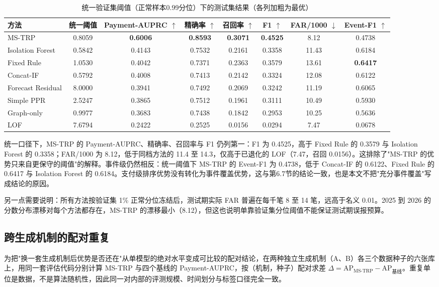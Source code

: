 \documentclass[a4paper,fleqn]{cas-dc}
\begin{document}
\begin{table}[pos=tbp]
\small
\caption{统一验证集阈值（正常样本0.99分位）下的测试集结果（各列加粗为最优）}
\begin{tabular*}{\tblwidth}{@{\extracolsep{\fill}}lccccccc@{}}
\toprule
方法 & 统一阈值 & Payment-AUPRC $\uparrow$ & 精确率 $\uparrow$ & 召回率 $\uparrow$ & F1 $\uparrow$ & FAR/1000 $\downarrow$ & Event-F1 $\uparrow$ \\
\midrule
MS-TRP & 0.8059 & \textbf{0.6006} & \textbf{0.8593} & \textbf{0.3071} & \textbf{0.4525} & 8.12 & 0.4738 \\
Isolation Forest & 0.5842 & 0.4143 & 0.7532 & 0.2161 & 0.3358 & 11.43 & 0.6184 \\
Fixed Rule & 1.0530 & 0.4042 & 0.7371 & 0.2363 & 0.3579 & 13.61 & \textbf{0.6417} \\
Concat-IF & 0.5792 & 0.4008 & 0.7413 & 0.2142 & 0.3324 & 12.08 & 0.6122 \\
Forecast Residual & 8.0000 & 0.3941 & 0.7492 & 0.2069 & 0.3242 & 11.19 & 0.6065 \\
Simple PPR & 2.5247 & 0.3865 & 0.7512 & 0.1961 & 0.3111 & 10.49 & 0.5930 \\
Graph-only & 0.9977 & 0.3683 & 0.7438 & 0.1842 & 0.2953 & 10.25 & 0.5636 \\
LOF & 7.6794 & 0.2422 & 0.2525 & 0.0156 & 0.0294 & 7.47 & 0.0678 \\
\bottomrule
\end{tabular*}
\end{table}

统一口径下，MS-TRP 的 Payment-AUPRC、精确率、召回率与 F1 仍列第一：F1 为 0.4525，高于 Fixed Rule 的 0.3579 与 Isolation Forest 的 0.3358；FAR/1000 为 8.12，低于同档方法的 11.4 至 14.3，仅高于已退化的 LOF（7.47，召回 0.0156）。这排除了"MS-TRP 的优势只来自更保守的阈值"的解释。事件级仍然相反：统一阈值下 MS-TRP 的 Event-F1 为 0.4738，低于 Concat-IF 的 0.6122、Fixed Rule 的 0.6417 与 Isolation Forest 的 0.6184。支付级排序优势没有转化为事件覆盖优势，这与第6.7节的结论一致，也是本文不把"充分事件覆盖"写成结论的原因。

另一点需要说明：所有方法按验证集 1\% 正常分位冻结后，测试期实际 FAR 普遍在每千笔 8 至 14 笔，远高于名义 0.01。2025 到 2026 的分数分布漂移对每个方法都存在，MS-TRP 的漂移最小（8.12），但这也说明单靠验证集分位阈值不能保证测试期误报预算。

\subsection{跨生成机制的配对重复}
为把"换一套生成机制后优势是否还在"从单模型的绝对水平变成可比较的配对结论，在两种独立生成机制（A、B）各三个数据种子的六张库上，用同一套评估代码分别计算 MS-TRP 与四个基线的 Payment-AUPRC，按（机制，种子）配对求差 $\Delta = \mathrm{AP}_{\text{MS-TRP}} - \mathrm{AP}_{\text{基线}}$。重复单位是数据，不是算法随机性，因此同一对内部的评测规模、时间划分与标签口径完全一致。
\end{document}
